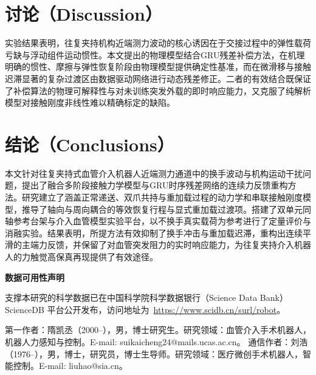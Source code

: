 \documentclass{JQRnew}
\begin{document}
\section{讨论（Discussion）}

实验结果表明，往复夹持机构近端测力波动的核心诱因在于交接过程中的弹性载荷亏缺与浮动组件运动惯性。本文提出的物理模型结合GRU残差补偿方法，在机理明确的惯性、摩擦与弹性恢复阶段由物理模型提供确定性基准，而在微滑移与接触迟滞显著的复杂过渡区由数据驱动网络进行动态残差修正。二者的有效结合既保证了补偿算法的物理可解释性与对未训练突发外载的即时响应能力，又克服了纯解析模型对接触刚度非线性难以精确标定的缺陷。

\section{结论（Conclusions）}

本文针对往复夹持式血管介入机器人近端测力通道中的换手波动与机构运动干扰问题，提出了融合多阶段接触力学模型与GRU时序残差网络的连续力反馈重构方法。研究建立了涵盖正常递送、双爪共持与重加载过程的动力学和串联接触刚度模型，推导了轴向与周向耦合的等效恢复行程与显式重加载过渡项。搭建了双单元同轴参考台架与介入血管模型实验平台，以不换手真实载荷为参考进行了定量评价与消融实验。结果表明，所提方法有效抑制了换手冲击与重加载迟滞，重构出连续平滑的主端力反馈，并保留了对血管突发阻力的实时响应能力，为往复夹持介入机器人的力触觉高保真再现提供了有效途径。

\noindent
\textbf{数据可用性声明}

支撑本研究的科学数据已在中国科学院科学数据银行（Science Data Bank）ScienceDB 平台公开发布，访问地址为~\url{https://www.scidb.cn/surl/robot}。

\nocite{*}



\begin{AuthorIntroduction}
\Intro 第一作者：隋凯丞（2000--），男，博士研究生。研究领域：血管介入手术机器人，机器人力感知与控制。E-mail: suikaicheng24@mails.ucas.ac.cn。
\Intro 通信作者：刘浩（1976--），男，博士，研究员，博士生导师。研究领域：医疗微创手术机器人，智能控制。E-mail: liuhao@sia.cn。
\end{AuthorIntroduction}

\balance
\end{document}
